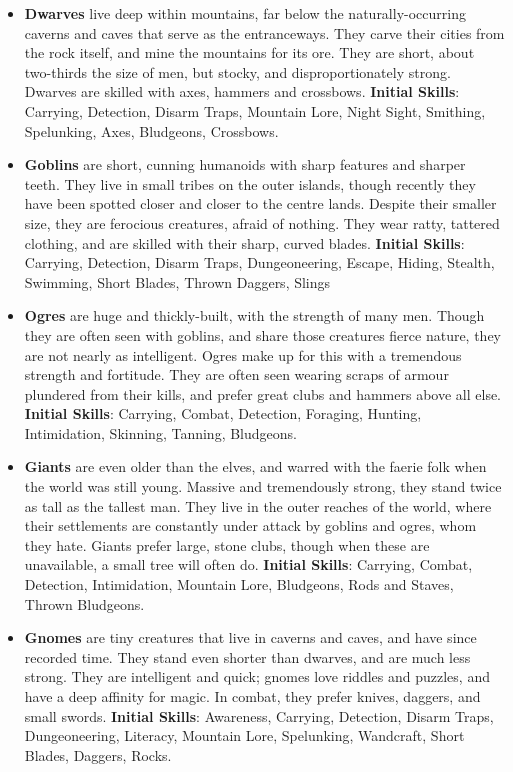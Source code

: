 \begin{itemize}
\item {\bf Dwarves} live deep within mountains, far below the 
naturally-occurring caverns and caves that serve as the entranceways.  They
carve their cities from the rock itself, and mine the mountains for its 
ore.  They are short, about two-thirds the size of men, but stocky, and 
disproportionately strong.  Dwarves are skilled with axes, hammers and 
crossbows. \textbf{Initial Skills}: Carrying, Detection, Disarm Traps,
Mountain Lore, Night Sight, Smithing, Spelunking, Axes, Bludgeons,
Crossbows.

\item {\bf Goblins} are short, cunning humanoids with sharp features and 
sharper teeth.  They live in small tribes on the outer islands, though 
recently they have been spotted closer and closer to the centre lands.   
Despite their smaller size, they are ferocious creatures, afraid of 
nothing.  They wear ratty, tattered clothing, and are skilled with their 
sharp, curved blades. \textbf{Initial Skills}: Carrying, Detection,
Disarm Traps, Dungeoneering, Escape, Hiding, Stealth, Swimming, Short
Blades, Thrown Daggers, Slings

\item {\bf Ogres} are huge and thickly-built, with the strength of many 
men.  Though they are often seen with goblins, and share those creatures 
fierce nature, they are not nearly as intelligent.  Ogres make up for this 
with a tremendous strength and fortitude.  They are often seen wearing 
scraps of armour plundered from their kills, and prefer great clubs and 
hammers above all else. \textbf{Initial Skills}: Carrying, Combat,
Detection, Foraging, Hunting, Intimidation, Skinning, Tanning, Bludgeons.

\item {\bf Giants} are even older than the elves, and warred with the 
faerie folk when the world was still young.  Massive and tremendously 
strong, they stand twice as tall as the tallest man.  They live in the 
outer reaches of the world, where their settlements are constantly under 
attack by goblins and ogres, whom they hate. Giants prefer large, stone 
clubs, though when these are unavailable, a small tree will often do.
\textbf{Initial Skills}: Carrying, Combat, Detection, Intimidation,
Mountain Lore, Bludgeons, Rods and Staves, Thrown Bludgeons.

\item {\bf Gnomes} are tiny creatures that live in caverns and caves, and 
have since recorded time.  They stand even shorter than dwarves, and are 
much less strong.  They are intelligent and quick; gnomes love riddles and 
puzzles, and have a deep affinity for magic.  In combat, they prefer knives,
daggers, and small swords. \textbf{Initial Skills}: Awareness, Carrying,
Detection, Disarm Traps, Dungeoneering, Literacy, Mountain Lore, Spelunking,
Wandcraft, Short Blades, Daggers, Rocks.
\end{itemize}

